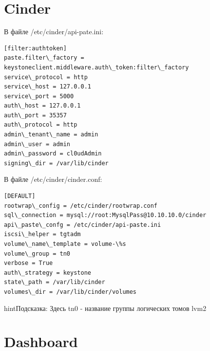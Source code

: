 \documentclass[letterpaper,10pt,russian]{sphinxmanual}
\begin{document}
\section{Cinder}
\label{index:cinder}





В файле /etc/cinder/api-pate.ini:

\begin{Verbatim}[commandchars=\\\{\}]
[filter:authtoken]
paste.filter\_factory = keystoneclient.middleware.auth\_token:filter\_factory
service\_protocol = http
service\_host = 127.0.0.1
service\_port = 5000
auth\_host = 127.0.0.1
auth\_port = 35357
auth\_protocol = http
admin\_tenant\_name = admin
admin\_user = admin
admin\_password = cl0udAdmin
signing\_dir = /var/lib/cinder
\end{Verbatim}

В файле /etc/cinder/cinder.conf:

\begin{Verbatim}[commandchars=\\\{\}]
[DEFAULT]
rootwrap\_config = /etc/cinder/rootwrap.conf
sql\_connection = mysql://root:MysqlPass@10.10.10.0/cinder
api\_paste\_confg = /etc/cinder/api-paste.ini
iscsi\_helper = tgtadm
volume\_name\_template = volume-\%s
volume\_group = tn0
verbose = True
auth\_strategy = keystone
state\_path = /var/lib/cinder
volumes\_dir = /var/lib/cinder/volumes
\end{Verbatim}

\begin{notice}{hint}{Подсказка:}
Здесь tn0 - название группы логических томов lvm2
\end{notice}





\section{Dashboard}
\label{index:dashboard}



\renewcommand{\indexname}{Алфавитный указатель}
\printindex
\end{document}

